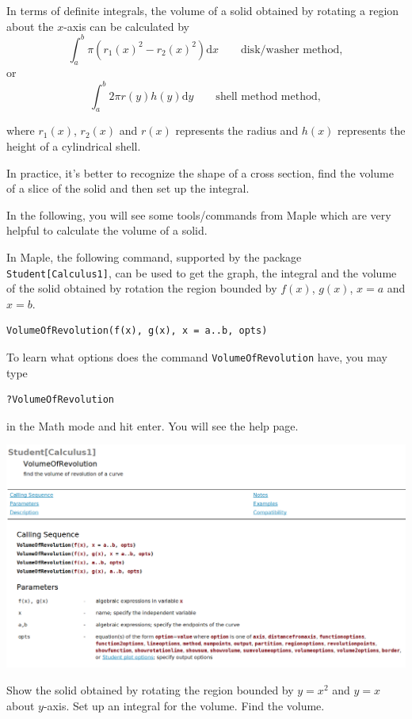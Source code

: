 \documentclass[]{book}
\theoremstyle{definition}
\theoremstyle{definition}
\theoremstyle{definition}
\theoremstyle{remark}
\let\BeginKnitrBlock\begin \let\EndKnitrBlock\end
\begin{document}
In terms of definite integrals, the volume of a solid obtained by rotating a region about the \(x\)-axis can be calculated by
\[\int_a^b \pi (r_1(x)^2 - r_2(x)^2) \mathrm{d} x \qquad \text{disk/washer method},\]
or
\[\int_a^b 2\pi r(y) h(y) \mathrm{d} y \qquad \text{shell method method},\]

where \(r_1(x)\), \(r_2(x)\) and \(r(x)\) represents the radius and \(h(x)\) represents the height of a cylindrical shell.

In practice, it's better to recognize the shape of a cross section, find the volume of a slice of the solid and then set up the integral.

In the following, you will see some tools/commands from Maple which are very helpful to calculate the volume of a solid.

In Maple, the following command, supported by the package \texttt{Student{[}Calculus1{]}}, can be used to get the graph, the integral and the volume of the solid obtained by rotation the region bounded by \(f(x)\), \(g(x)\), \(x=a\) and \(x=b\).

\begin{verbatim}
VolumeOfRevolution(f(x), g(x), x = a..b, opts)
\end{verbatim}

To learn what options does the command \texttt{VolumeOfRevolution} have, you may type

\begin{verbatim}
?VolumeOfRevolution
\end{verbatim}

in the Math mode and hit enter. You will see the help page.

\includegraphics{figs/VolOfRev-help-page.png}

\BeginKnitrBlock{example}
\protect\hypertarget{exm:unnamed-chunk-91}{}{\label{exm:unnamed-chunk-91} }Show the solid obtained by rotating the region bounded by \(y=x^2\) and \(y=x\) about \(y\)-axis. Set up an integral for the volume. Find the volume.
\EndKnitrBlock{example}
\end{document}
